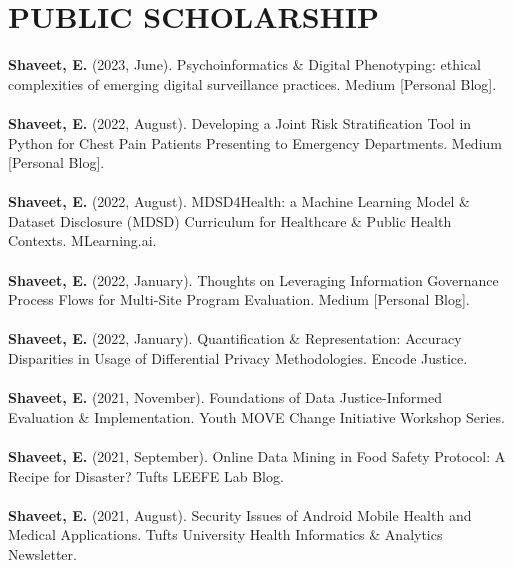 \documentclass[a4paper,12pt]{article}
\begin{document}
{\section*{PUBLIC SCHOLARSHIP}
\textbf{Shaveet, E.} (2023, June). Psychoinformatics \& Digital Phenotyping: ethical complexities of emerging digital surveillance practices. Medium [Personal Blog].\\
\\
\textbf{Shaveet, E.} (2022, August). Developing a Joint Risk Stratification Tool in Python for Chest Pain Patients Presenting to Emergency Departments. Medium [Personal Blog].\\
\\
\textbf{Shaveet, E.} (2022, August). MDSD4Health: a Machine Learning Model \& Dataset Disclosure (MDSD) Curriculum for Healthcare \& Public Health Contexts. MLearning.ai.\\
\\
\textbf{Shaveet, E.} (2022, January). Thoughts on Leveraging Information Governance Process Flows for Multi-Site Program Evaluation. Medium [Personal Blog].\\
\\
\textbf{Shaveet, E.} (2022, January). Quantification \& Representation: Accuracy Disparities in Usage of Differential Privacy Methodologies. Encode Justice.\\
\\
\textbf{Shaveet, E.} (2021, November). Foundations of Data Justice-Informed Evaluation \& Implementation. Youth MOVE Change Initiative Workshop Series.\\
\pagebreak 
\\
\textbf{Shaveet, E.} (2021, September). Online Data Mining in Food Safety Protocol: A Recipe for Disaster? Tufts LEEFE Lab Blog.\\
\\
\textbf{Shaveet, E.} (2021, August). Security Issues of Android Mobile Health and Medical Applications. Tufts University Health Informatics \& Analytics Newsletter.\\
}
\end{document}
